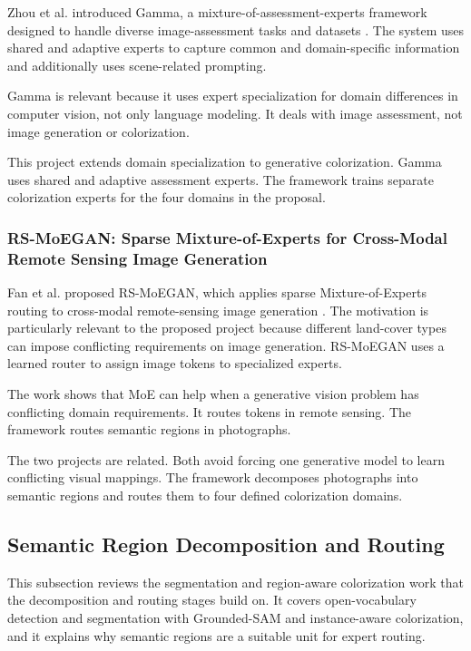 \documentclass{FastFyp}
\begin{document}
Zhou et al. introduced Gamma, a mixture-of-assessment-experts framework designed to handle diverse image-assessment tasks and datasets \cite{ref15}. The system uses shared and adaptive experts to capture common and domain-specific information and additionally uses scene-related prompting.

Gamma is relevant because it uses expert specialization for domain differences in computer vision, not only language modeling. It deals with image assessment, not image generation or colorization.

This project extends domain specialization to generative colorization. Gamma uses shared and adaptive assessment experts. The framework trains separate colorization experts for the four domains in the proposal.

\subsubsection{RS-MoEGAN: Sparse Mixture-of-Experts for Cross-Modal Remote Sensing Image Generation}

Fan et al. proposed RS-MoEGAN, which applies sparse Mixture-of-Experts routing to cross-modal remote-sensing image generation \cite{ref16}. The motivation is particularly relevant to the proposed project because different land-cover types can impose conflicting requirements on image generation. RS-MoEGAN uses a learned router to assign image tokens to specialized experts.

The work shows that MoE can help when a generative vision problem has conflicting domain requirements. It routes tokens in remote sensing. The framework routes semantic regions in photographs.

The two projects are related. Both avoid forcing one generative model to learn conflicting visual mappings. The framework decomposes photographs into semantic regions and routes them to four defined colorization domains.

\subsection{Semantic Region Decomposition and Routing}

This subsection reviews the segmentation and region-aware colorization work that the decomposition and routing stages build on. It covers open-vocabulary detection and segmentation with Grounded-SAM and instance-aware colorization, and it explains why semantic regions are a suitable unit for expert routing.
\end{document}
